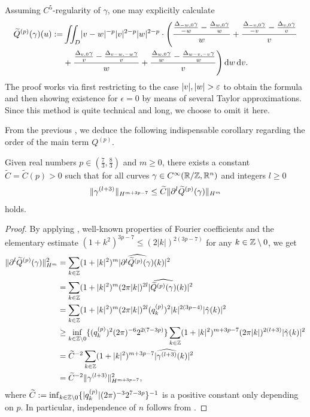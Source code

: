 \begin{remark}
    Assuming $C^5$-regularity of $\gamma$, one may explicitly calculate
    \begin{align*}
        \widetilde Q^{(p)}(\gamma)(u) :=& \iint_D \lvert v-w\rvert^{-p} \lvert v\rvert^{2-p} \lvert w\rvert^{2-p} \cdot \Biggl(
        \frac {\frac{\Delta_{-w,0} \gamma} {-w} - \frac {\Delta_{w,0} \gamma} {w}} {w}
        + \frac {\frac {\Delta_{-v,0} \gamma} {-v} - \frac {\Delta_{v,0} \gamma} {v}} {v}\\
        &+ \frac {\frac {\Delta_{v,0} \gamma} {v} - \frac {\Delta_{v-w,-w} \gamma} {v}} {w}
        + \frac {\frac {\Delta_{w,0} \gamma} {w} - \frac {\Delta_{w-v,-v} \gamma} {w}} {v}
        \Biggr)
        \,\mathrm{d} w \,\mathrm{d} v.
    \end{align*}
    The proof works via first restricting to the case $\lvert v\rvert,\lvert w\rvert>\varepsilon$ to obtain the formula and then showing existence for $\epsilon = 0$ by means of several Taylor approximations.
    Since this method is quite technical and long, we choose to omit it here.
\end{remark}

From the previous , we deduce the following indispensable corollary regarding the order of the main term $Q^{(p)}$.


\begin{corollary}  \label{cor:Ql}
	Given real numbers $p\in (\tfrac 73, \tfrac 83)$ and $m\geq 0$, there exists a constant $ \widetilde{C}=\widetilde{C}(p)>0$ such that for all curves $\gamma \in C^\infty(\mathbb{R}/\mathbb{Z}, \mathbb{R}^n)$ and  integers $l\geq 0$ 
	\begin{align*}
	\|\gamma^{(l+3)} \|_{H^{m+3p-7}} \leq \widetilde{C} \|\partial^{l} \widetilde Q^{(p)}(\gamma)\|_{H^m}
	\end{align*}
	holds.
\end{corollary}
\begin{proof}
	By applying , well-known properties of Fourier coefficients and the elementary estimate $(1+k^2)^{3p-7} \leq (2|k|)^{2(3p-7)}$ for any $k\in \mathbb{Z}  \setminus 0$,  we get
	\begin{align*}
	\|\partial^{l}\widetilde Q^{(p)} (\gamma) \|_{H^m}^2 &= \sum_{k\in \mathbb{Z}} (1+|k|^2)^m|\widehat{\partial^{l}\widetilde Q^{(p)} (\gamma)}(k)|^2 \\
	&= \sum_{k\in \mathbb{Z}} (1+|k|^2)^m (2\pi| k|)^{2l} |\widehat{\widetilde Q^{(p)} (\gamma)}(k)|^2 \\
	&= \sum_{k\in \mathbb{Z}} (1+|k|^2)^m (2\pi| k|)^{2l} (q_k^{(p)})^2 |k|^{2(3p-4)} |\hat{\gamma} (k)|^2\\
	&\geq \inf_{k\in\mathbb{Z}\setminus 0} \{(q_k^{(p)})^2 (2\pi)^{-6} 2^{2(7-3p)} \} \sum_{k \in \mathbb{Z}} (1+|k|^2)^{m+3p-7} (2\pi| k|)^{2(l+3)}   |\hat{\gamma} (k)|^2 \\
	&= \widetilde{C}^{-2} \sum_{k \in \mathbb{Z}} (1+|k|^2)^{m+3p-7} |\widehat{\gamma^{(l+3)} } (k)|^2 \\
	&= \widetilde{C}^{-2}   \|\gamma^{(l+3)} \|_{H^{m+3p-7}}^2,
	\end{align*}
	where $\widetilde{C}:=\inf_{k\in\mathbb{Z}\setminus{0}} \{\lvert q_k^{(p)}\rvert (2\pi)^{-3} 2^{7-3p}\}^{-1}$ is a positive constant only depending on $p$.
    In particular, independence of $n$ follows from  .
\end{proof}
